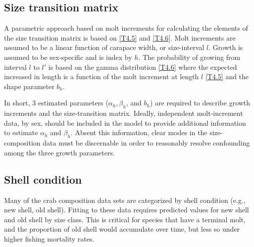 \subsection{Size transition matrix} %
\label{sub:size_transition_matrix}

A parametric approach based on molt increments for calculating the elements of the size transition matrix is based on \eqref{T4.5} and \eqref{T4.6}.  Molt increments are assumed to be a linear function of carapace width, or size-interval $l$. Growth is assumed to be sex-specific and is index by $h$.  The probability of growing from interval $l$ to $l'$ is based on the gamma distribution \eqref{T4.6} where the expected increased in length is a function of the molt increment at length $l$ \eqref{T4.5} and the shape parameter $b_h$.

In short, 3 estimated parameters ($\alpha_h, \beta_h$, and $b_h$) are required to describe growth increments and the size-transition matrix.  Ideally, independent molt-increment data, by sex, should be included in the model to provide additional information to estimate $\alpha_h$ and $\beta_h$.  Absent this information, clear modes in the size-composition data must be discernable in order to reasonably resolve confounding among the three growth parameters.


\subsection{Shell condition} %
\label{sub:shell_condition}
Many of the crab composition data sets are categorized by shell condition (e.g., new shell, old shell).  Fitting to these data requires predicted values for new shell and old shell by size class.  This is critical for species that have a terminal molt, and the proportion of old shell would accumulate over time, but less so under higher fishing mortality rates.
